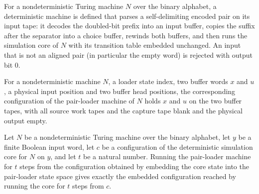 \begin{definition}
\label{Complexity.contPairTM}
\leanok
{}
For a nondeterministic Turing machine $N$ over the binary alphabet, a deterministic machine is defined that parses a self-delimiting encoded pair on its input tape: it decodes the doubled-bit prefix into an input buffer, copies the suffix after the separator into a choice buffer, rewinds both buffers, and then runs the simulation core of $N$ with its transition table embedded unchanged. An input that is not an aligned pair (in particular the empty word) is rejected with output bit $0$.
\end{definition}

\begin{definition}
\label{Complexity.contLoadCfg}
\leanok
{}
For a nondeterministic machine $N$, a loader state index, two buffer words $x$ and $u$, a physical input position and two buffer head positions, the corresponding configuration of the pair-loader machine of $N$ holds $x$ and $u$ on the two buffer tapes, with all source work tapes and the capture tape blank and the physical output empty.
\end{definition}

\begin{lemma}
\label{Complexity.cont_core_run}
\leanok
{}
Let $N$ be a nondeterministic Turing machine over the binary alphabet, let $y$ be a
finite Boolean input word, let $c$ be a configuration of the deterministic simulation
core for $N$ on $y$, and let $t$ be a natural number. Running the pair-loader machine
for $t$ steps from the configuration obtained by embedding the core state into the
pair-loader state space gives exactly the embedded configuration reached by running the
core for $t$ steps from $c$.
\end{lemma}

